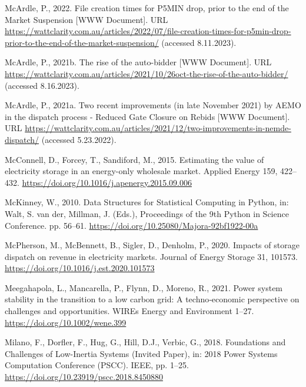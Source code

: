 \documentclass[12pt,a4paper,]{report}
\newlength{\cslhangindent}
\newenvironment{CSLReferences}[2] %
 {%
  \setlength{\parindent}{0pt}
  \ifodd #1 \everypar{\setlength{\hangindent}{\cslhangindent}}\ignorespaces\fi
  \ifnum #2 > 0
  \setlength{\parskip}{#2\baselineskip}
  \fi
 }%
 {}
\begin{document}
\begin{CSLReferences}{1}{0}
\leavevmode{}%
McArdle, P., 2022. File creation times for {P5MIN} drop, prior to the
end of the {Market Suspension} {[}WWW Document{]}. URL
\url{https://wattclarity.com.au/articles/2022/07/file-creation-times-for-p5min-drop-prior-to-the-end-of-the-market-suspension/}
(accessed 8.11.2023).

\leavevmode{}%
McArdle, P., 2021b. The rise of the auto-bidder {[}WWW Document{]}. URL
\url{https://wattclarity.com.au/articles/2021/10/26oct-the-rise-of-the-auto-bidder/}
(accessed 8.16.2023).

\leavevmode{}%
McArdle, P., 2021a. Two recent improvements (in late {November} 2021) by
{AEMO} in the dispatch process - {Reduced Gate Closure} on {Rebids}
{[}WWW Document{]}. URL
\url{https://wattclarity.com.au/articles/2021/12/two-improvements-in-nemde-dispatch/}
(accessed 5.23.2022).

\leavevmode{}%
McConnell, D., Forcey, T., Sandiford, M., 2015. Estimating the value of
electricity storage in an energy-only wholesale market. Applied Energy
159, 422--432. \url{https://doi.org/10.1016/j.apenergy.2015.09.006}

\leavevmode{}%
McKinney, W., 2010. Data {Structures} for {Statistical Computing} in
{Python}, in: Walt, S. van der, Millman, J. (Eds.), Proceedings of the
9th {Python} in {Science Conference}. pp. 56--61.
\url{https://doi.org/10.25080/Majora-92bf1922-00a}

\leavevmode{}%
McPherson, M., McBennett, B., Sigler, D., Denholm, P., 2020. Impacts of
storage dispatch on revenue in electricity markets. Journal of Energy
Storage 31, 101573. \url{https://doi.org/10.1016/j.est.2020.101573}

\leavevmode{}%
Meegahapola, L., Mancarella, P., Flynn, D., Moreno, R., 2021. Power
system stability in the transition to a low carbon grid: {A}
techno‐economic perspective on challenges and opportunities. WIREs
Energy and Environment 1--27. \url{https://doi.org/10.1002/wene.399}

\leavevmode{}%
Milano, F., Dorfler, F., Hug, G., Hill, D.J., Verbic, G., 2018.
Foundations and {Challenges} of {Low-Inertia Systems} ({Invited Paper}),
in: 2018 {Power Systems Computation Conference} ({PSCC}). IEEE, pp.
1--25. \url{https://doi.org/10.23919/pscc.2018.8450880}


\end{CSLReferences}
\end{document}
